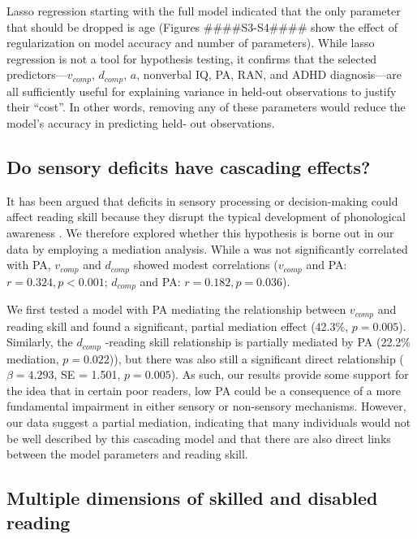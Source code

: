 \documentclass[../uwthesis.tex]{subfiles}
\begin{document}
Lasso regression starting with the full model indicated that the only parameter that should
be dropped is age (Figures ####S3-S4#### show the effect of regularization on model accuracy and number
of parameters). While lasso regression is not a tool for hypothesis testing, it confirms that the
selected predictors—$v_{comp}$, $d_{comp}$, $a$, nonverbal IQ, PA, RAN, and ADHD diagnosis—are all
sufficiently useful for explaining variance in held-out observations to justify their “cost”. In other
words, removing any of these parameters would reduce the model’s accuracy in predicting held-
out observations.

\subsection{Do sensory deficits have cascading effects?}
It has been argued that deficits in sensory processing or decision-making could affect
reading skill because they disrupt the typical development of phonological awareness 
\cite{Lieder2019PerceptualDyslexia,Manis1997,Richardson2004}. We
therefore explored whether this hypothesis is borne out in our data by employing a mediation
analysis. While a was not significantly correlated with PA, $v_{comp}$ and $d_{comp}$ showed modest
correlations ($v_{comp}$ and PA: $r = 0.324, p < 0.001$; $d_{comp}$ and PA: $r = 0.182, p = 0.036$).

We first tested a model with PA mediating the relationship between $v_{comp}$ and reading skill
and found a significant, partial mediation effect (42.3\%, $p = 0.005$). Similarly, the $d_{comp}$ -reading
skill relationship is partially mediated by PA (22.2\% mediation, $p = 0.022$)), but there was also
still a significant direct relationship ($\beta = 4.293$, SE = 1.501, $p = 0.005$). As such, our results
provide some support for the idea that in certain poor readers, low PA could be a consequence of
a more fundamental impairment in either sensory or non-sensory mechanisms. However, our data
suggest a partial mediation, indicating that many individuals would not be well described by this
cascading model and that there are also direct links between the model parameters and reading
skill.

\subsection{Multiple dimensions of skilled and disabled reading}
\end{document}
